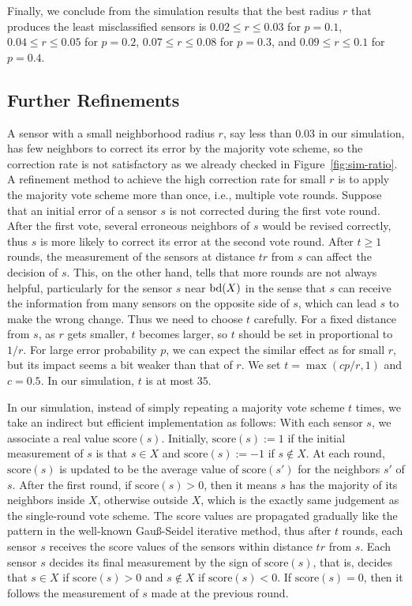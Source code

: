 \documentclass{article}
\def\bd{\mathop{\rm bd}}
\begin{document}
\par
Finally, we conclude from the simulation results that the best radius $r$ that produces the least misclassified sensors is $0.02\leq r \leq 0.03$ for $p = 0.1$, $0.04\leq r \leq 0.05$ for $p = 0.2$, $0.07\leq r \leq0.08$ for $p = 0.3$, and $0.09\leq r \leq 0.1$ for $p= 0.4$.

\subsection{Further Refinements}

A sensor with a small neighborhood radius $r$, say less than $0.03$ in our simulation, has few neighbors to correct its error by the majority vote scheme, so the correction rate is not satisfactory as we already checked in Figure~\ref{fig:sim-ratio}. A refinement method to achieve the high correction rate for small $r$ is to apply the majority vote scheme more than once, i.e., multiple vote rounds. Suppose that an initial error of a sensor $s$ is not corrected during the first vote round. After the first vote, several erroneous neighbors of $s$ would be revised correctly, thus $s$ is more likely to correct its error at the second vote round. After $t\geq 1$ rounds, the measurement of the sensors at distance $tr$ from $s$ can affect the decision of $s$. This, on the other hand, tells that more rounds are not always helpful, particularly for the sensor $s$ near $\bd(X)$ in the sense that $s$ can receive the information from many sensors on the opposite side of $s$, which can lead $s$ to make the wrong change. Thus we need to choose $t$ carefully. For a fixed distance from $s$, as $r$ gets smaller, $t$ becomes larger, so $t$ should be set in proportional to $1/r$. For large error probability $p$, we can expect the similar effect as for small $r$, but its impact seems a bit weaker than that of $r$. We set $t = \max(cp/{r},1)$ and $c = 0.5$. In our simulation, $t$ is at most $35$.

\par
In our simulation, instead of simply repeating a majority vote scheme $t$ times, we take an indirect but efficient implementation as follows: With each sensor $s$, we associate a real value $\mathrm{score}(s)$. Initially, $\mathrm{score}(s):= 1$ if the initial measurement of $s$ is that $s \in X$ and $\mathrm{score}(s) := -1$ if $s\not\in X$. At each round, $\mathrm{score}(s)$ is updated to be the average value of $\mathrm{score}(s')$ for the neighbors $s'$ of $s$. After the first round, if $\mathrm{score}(s) > 0$, then it means $s$ has the majority of its neighbors inside $X$, otherwise outside $X$, which is the exactly same judgement as the single-round vote scheme. The score values are propagated gradually like the pattern in the well-known Gau{\ss}-Seidel iterative method, thus after $t$ rounds, each sensor $s$ receives the score values of the sensors within distance $tr$ from $s$. Each sensor $s$ decides its final measurement by the sign of $\mathrm{score}(s)$, that is, decides that $s\in X$ if $\mathrm{score}(s) >0$ and $s\not\in X$ if $\mathrm{score}(s) <0$. If $\mathrm{score}(s)=0$, then it follows the measurement of $s$ made at the previous round.
\end{document}

